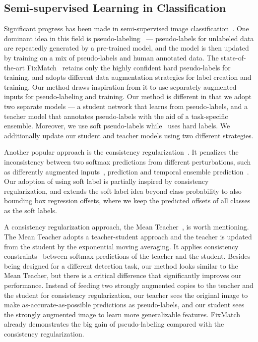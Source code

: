 \documentclass[final]{cvpr}
\begin{document}
\subsection{Semi-supervised Learning in Classification}
Significant progress has been made in semi-supervised image classification~\cite{tarvainen2017mean,berthelot2019mixmatch,berthelot2019remixmatch,zhu2002learning,sohn2020fixmatch,laine2016temporal,xie2019unsupervised,iscen2019label}.
One dominant idea in this field is pseudo-labeling~\cite{sohn2020fixmatch, arazo2020pseudo, lee2013pseudo, sohn2020fixmatch,berthelot2019mixmatch,berthelot2019remixmatch,zhai2019s4l,wang2018towards} --- pseudo-labels for unlabeled data are repeatedly generated by a pre-trained model, and the model is then updated by training on a mix of pseudo-labels and human annotated data.
The state-of-the-art FixMatch~\cite{sohn2020fixmatch} retains only the highly confident hard pseudo-labels for training, and adopts different data augmentation strategies for label creation and training.  
Our method draws inspiration from it to use separately augmented inputs for pseudo-labeling and training. Our method is different in that we adopt two separate models --- a student network that learns from pseudo-labels, and a teacher model that annotates pseudo-labels with the aid of a task-specific ensemble. Moreover, we use soft pseudo-labels while~\cite{sohn2020fixmatch} uses hard labels. We additionally update our student and teacher models using two different strategies.

Another popular approach is the consistency regularization~\cite{laine2016temporal,tarvainen2017mean}.
It penalizes the inconsistency between two softmax predictions from different perturbations, such as differently augmented inputs~\cite{laine2016temporal}, prediction and temporal ensemble prediction~\cite{laine2016temporal}.
Our adoption of using soft label is partially inspired by consistency regularization, and extends the soft label idea beyond class probability to also bounding box regression offsets, 
where we keep the predicted offsets of all classes as the soft labels.

A consistency regularization approach, the Mean Teacher~\cite{tarvainen2017mean}, is worth mentioning.
The Mean Teacher adopts a teacher-student approach and the teacher is updated from the student by the exponential moving averaging.
It applies consistency constraints~\cite{tarvainen2017mean} between softmax predictions of the teacher and the student.
Besides being designed for a different detection task, our method looks similar to the Mean Teacher, but there is a critical difference that significantly improves our performance.
Instead of feeding two strongly augmented copies to the teacher and the student for consistency regularization, our teacher sees the original image to make as-accurate-as-possible predictions as pseudo-labels, and our student sees the strongly augmented image to learn more generalizable features.
FixMatch~\cite{sohn2020fixmatch} already demonstrates the big gain of pseudo-labeling compared with the consistency regularization.
\end{document}
